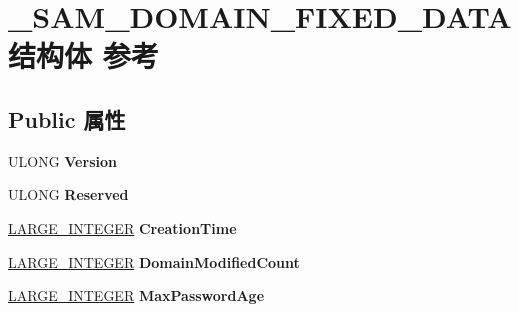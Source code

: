 \hypertarget{struct___s_a_m___d_o_m_a_i_n___f_i_x_e_d___d_a_t_a}{}\section{\+\_\+\+S\+A\+M\+\_\+\+D\+O\+M\+A\+I\+N\+\_\+\+F\+I\+X\+E\+D\+\_\+\+D\+A\+T\+A结构体 参考}
\label{struct___s_a_m___d_o_m_a_i_n___f_i_x_e_d___d_a_t_a}
\subsection*{Public 属性}
\begin{DoxyCompactItemize}
\item 
\mbox{\label{struct___s_a_m___d_o_m_a_i_n___f_i_x_e_d___d_a_t_a_ad7a3c1d577f3fb67579749e7d264681c}} 
U\+L\+O\+NG {\bfseries Version}
\item 
\mbox{\label{struct___s_a_m___d_o_m_a_i_n___f_i_x_e_d___d_a_t_a_a3e8773fb64afe1eee0ce412b21af3089}} 
U\+L\+O\+NG {\bfseries Reserved}
\item 
\mbox{\label{struct___s_a_m___d_o_m_a_i_n___f_i_x_e_d___d_a_t_a_a32a83478d87a0e8fab0814fd8b54ce95}} 
\hyperlink{union___l_a_r_g_e___i_n_t_e_g_e_r}{L\+A\+R\+G\+E\+\_\+\+I\+N\+T\+E\+G\+ER} {\bfseries Creation\+Time}
\item 
\mbox{\label{struct___s_a_m___d_o_m_a_i_n___f_i_x_e_d___d_a_t_a_ae507ad6d48f995085fe1b5195caf2b76}} 
\hyperlink{union___l_a_r_g_e___i_n_t_e_g_e_r}{L\+A\+R\+G\+E\+\_\+\+I\+N\+T\+E\+G\+ER} {\bfseries Domain\+Modified\+Count}
\item 
\mbox{\label{struct___s_a_m___d_o_m_a_i_n___f_i_x_e_d___d_a_t_a_aa21437e47eb55a072bd1b882dff2bcf3}} 
\hyperlink{union___l_a_r_g_e___i_n_t_e_g_e_r}{L\+A\+R\+G\+E\+\_\+\+I\+N\+T\+E\+G\+ER} {\bfseries Max\+Password\+Age}
\item 
\mbox{\label{struct___s_a_m___d_o_m_a_i_n___f_i_x_e_d___d_a_t_a_ae49cce209c81551b8d03d00f2104f838}} 

\end{DoxyCompactItemize}
